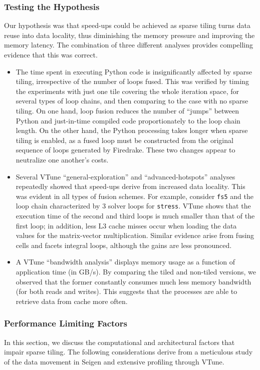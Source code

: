 \subsubsection{Testing the Hypothesis}
Our hypothesis was that speed-ups could be achieved as sparse tiling turns data reuse into data locality, thus diminishing the memory pressure and improving the memory latency. The combination of three different analyses provides compelling evidence that this was correct.

\begin{itemize}
\item The time spent in executing Python code is insignificantly affected by sparse tiling, irrespective of the number of loops fused. This was verified by timing the experiments with just one tile covering the whole iteration space, for several types of loop chains, and then comparing to the case with no sparse tiling. On one hand, loop fusion reduces the number of ``jumps'' between Python and just-in-time compiled code proportionately to the loop chain length. On the other hand, the Python processing takes longer when sparse tiling is enabled, as a fused loop must be constructed from the original sequence of loops generated by Firedrake. These two changes appear to neutralize one another's costs.
\item Several VTune ``general-exploration'' and ``advanced-hotspots'' analyses repeatedly showed that speed-ups derive from increased data locality. This was evident in all types of fusion schemes. For example, consider {\tt fs5} and the loop chain characterized by 3 solver loops for {\tt stress}. VTune shows that the execution time of the second and third loops is much smaller than that of the first loop; in addition, less L3 cache misses occur when loading the data values for the matrix-vector multiplication. Similar evidence arise from fusing cells and facets integral loops, although the gains are less pronounced.
\item A VTune ``bandwidth analysis'' displays memory usage as a function of application time (in GB/s). By comparing the tiled and non-tiled versions, we observed that the former constantly consumes much less memory bandwidth (for both reads and writes). This suggests that the processes are able to retrieve data from cache more often.
\end{itemize}

\subsubsection{Performance Limiting Factors}
In this section, we discuss the computational and architectural factors that impair sparse tiling. The following considerations derive from a meticulous study of the data movement in Seigen and extensive profiling through VTune. 

